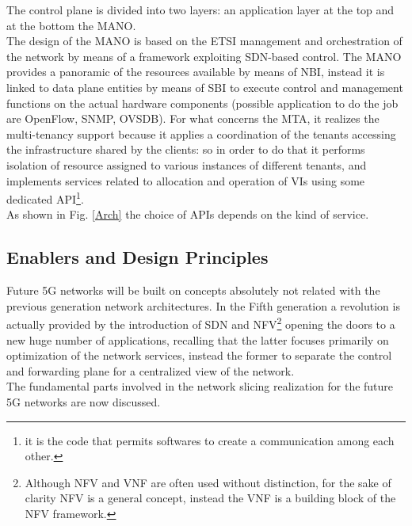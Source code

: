 \documentclass[a4paper,12pt]{report} %
\begin{document}
The control plane is divided into two layers: an application layer at the top and at the bottom the \gls{MANO}. \\
The design of the MANO is based on the ETSI management and orchestration of the network by means of a framework exploiting SDN-based control. The MANO
provides a panoramic of the resources available by means of \gls{NBI}, instead it is linked to data plane
entities by means of \gls{SBI} to execute control and management
functions on the actual hardware components (possible application to do the job are OpenFlow, SNMP, OVSDB).
For what concerns the \gls{MTA}, it realizes the
multi-tenancy support because it applies a coordination of the tenants accessing the infrastructure shared by the clients: so in order to do that it performs isolation of resource assigned to various instances of
different tenants, and implements services related to
allocation and operation of VIs using some dedicated \gls{API}\footnote{it is the code that permits softwares to create a communication among each other.}. \\
As shown in Fig. \ref{Arch} the choice of APIs depends on the kind of service. \cite{al20185g} \cite{ohlen2016data}

\subsection{Enablers and Design Principles}
Future 5G networks will be built on concepts absolutely not related with the previous generation
network architectures. In the Fifth generation a revolution is actually provided by the introduction of SDN
and \gls{NFV}\footnote{Although NFV and VNF are often used without distinction, for the sake of clarity NFV is a general concept, instead the VNF is a building block of the NFV framework.} opening the doors to a
new huge number of applications, recalling that the latter focuses primarily on optimization of the network services, instead the former to separate the control and forwarding plane for a centralized view of the network.\\
The fundamental parts involved in the network slicing realization for the future 5G networks are now discussed.
\end{document}
